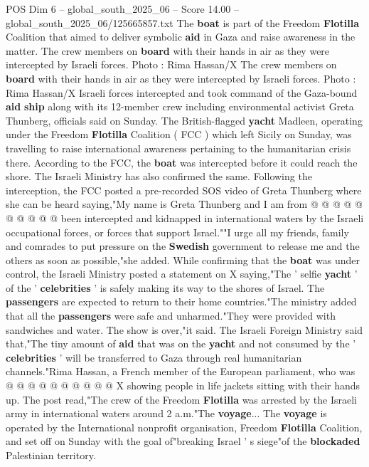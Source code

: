 \begin{textsample}{POS Dim 6 – global\_south\_2025\_06 – Score 14.00 – global\_south\_2025\_06/125665857.txt}  \label{ex:f6_pos_019}
The \textbf{boat} is part of the Freedom \textbf{Flotilla} Coalition that aimed to deliver symbolic \textbf{aid} in Gaza and raise awareness in the matter.
The crew members on \textbf{board} with their hands in air as they were intercepted by Israeli forces.
Photo : Rima Hassan/X The crew members on \textbf{board} with their hands in air as they were intercepted by Israeli forces.
Photo : Rima Hassan/X Israeli forces intercepted and took command of the Gaza-bound \textbf{aid} \textbf{ship} along with its 12-member crew including environmental activist Greta Thunberg, officials said on Sunday.
The British-flagged \textbf{yacht} Madleen, operating under the Freedom \textbf{Flotilla} Coalition ( FCC ) which left Sicily on Sunday, was travelling to raise international awareness pertaining to the humanitarian crisis there.
According to the FCC, the \textbf{boat} was intercepted before it could reach the shore.
The Israeli Ministry has also confirmed the same.
Following the interception, the FCC posted a pre-recorded SOS video of Greta Thunberg where she can be heard saying,"My name is Greta Thunberg and I am from @ @ @ @ @ @ @ @ @ @ been intercepted and kidnapped in international waters by the Israeli occupational forces, or forces that support Israel.""I urge all my friends, family and comrades to put pressure on the \textbf{Swedish} government to release me and the others as soon as possible,"she added.
While confirming that the \textbf{boat} was under control, the Israeli Ministry posted a statement on X saying,"The ' selfie \textbf{yacht} ' of the ' \textbf{celebrities} ' is safely making its way to the shores of Israel.
The \textbf{passengers} are expected to return to their home countries."The ministry added that all the \textbf{passengers} were safe and unharmed."They were provided with sandwiches and water.
The show is over,"it said.
The Israeli Foreign Ministry said that,"The tiny amount of \textbf{aid} that was on the \textbf{yacht} and not consumed by the ' \textbf{celebrities} ' will be transferred to Gaza through real humanitarian channels."Rima Hassan, a French member of the European parliament, who was @ @ @ @ @ @ @ @ @ @ X showing people in life jackets sitting with their hands up.
The post read,"The crew of the Freedom \textbf{Flotilla} was arrested by the Israeli army in international waters around 2 a.m."The \textbf{voyage}...
The \textbf{voyage} is operated by the International nonprofit organisation, Freedom \textbf{Flotilla} Coalition, and set off on Sunday with the goal of"breaking Israel ' s siege"of the \textbf{blockaded} Palestinian territory.

\end{textsample}
